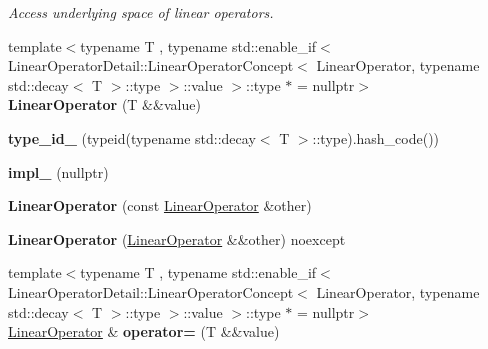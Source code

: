 \begin{DoxyCompactItemize}
\begin{DoxyCompactList}\small\item\em \-Access underlying space of linear operators. \end{DoxyCompactList}\item 
\hypertarget{classSpacy_1_1LinearOperator_ac8c1647e64c14ce857def39e0148baed}{{\footnotesize template$<$typename T , typename std\-::enable\-\_\-if$<$ Linear\-Operator\-Detail\-::\-Linear\-Operator\-Concept$<$ Linear\-Operator, typename std\-::decay$<$ T $>$\-::type $>$\-::value $>$\-::type $\ast$  = nullptr$>$ }\\{\bfseries \-Linear\-Operator} (\-T \&\&value)}\label{classSpacy_1_1LinearOperator_ac8c1647e64c14ce857def39e0148baed}

\item 
\hypertarget{classSpacy_1_1LinearOperator_a50e8099ec09b019a95433c725cef2b84}{{\bfseries type\-\_\-id\-\_\-} (typeid(typename std\-::decay$<$ \-T $>$\-::type).hash\-\_\-code())}\label{classSpacy_1_1LinearOperator_a50e8099ec09b019a95433c725cef2b84}

\item 
\hypertarget{classSpacy_1_1LinearOperator_a7c6c42dfe282b796c522905c728e240a}{{\bfseries impl\-\_\-} (nullptr)}\label{classSpacy_1_1LinearOperator_a7c6c42dfe282b796c522905c728e240a}

\item 
\hypertarget{classSpacy_1_1LinearOperator_a23c71e4f80fc5ccb45e8de979cbfe45d}{{\bfseries \-Linear\-Operator} (const \hyperlink{classSpacy_1_1LinearOperator}{\-Linear\-Operator} \&other)}\label{classSpacy_1_1LinearOperator_a23c71e4f80fc5ccb45e8de979cbfe45d}

\item 
\hypertarget{classSpacy_1_1LinearOperator_a54775f0b362198be4b92e13a688bb3b6}{{\bfseries \-Linear\-Operator} (\hyperlink{classSpacy_1_1LinearOperator}{\-Linear\-Operator} \&\&other) noexcept}\label{classSpacy_1_1LinearOperator_a54775f0b362198be4b92e13a688bb3b6}

\item 
\hypertarget{classSpacy_1_1LinearOperator_a5028289a4b4b38067800ce0514ae34fc}{{\footnotesize template$<$typename T , typename std\-::enable\-\_\-if$<$ Linear\-Operator\-Detail\-::\-Linear\-Operator\-Concept$<$ Linear\-Operator, typename std\-::decay$<$ T $>$\-::type $>$\-::value $>$\-::type $\ast$  = nullptr$>$ }\\\hyperlink{classSpacy_1_1LinearOperator}{\-Linear\-Operator} \& {\bfseries operator=} (\-T \&\&value)}\label{classSpacy_1_1LinearOperator_a5028289a4b4b38067800ce0514ae34fc}


\end{DoxyCompactItemize}
